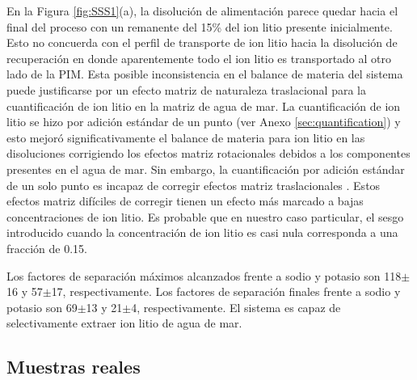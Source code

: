 En la Figura \ref{fig:SSS1}(a), la disolución de alimentación parece quedar hacia el final del proceso con un remanente del 15\% del ion litio presente inicialmente. Esto no concuerda con el perfil de transporte de ion litio hacia la disolución de recuperación en  donde aparentemente todo el ion litio es transportado al otro lado de la PIM. Esta posible inconsistencia en el balance de materia del sistema puede justificarse por un efecto matriz de naturaleza traslacional para la cuantificación de ion litio en la matriz de agua de mar. La cuantificación de ion litio se hizo por adición estándar de un punto (ver Anexo \ref{sec:quantification}) y esto mejoró significativamente el balance de materia para ion litio en las disoluciones corrigiendo los efectos matriz rotacionales debidos a los componentes presentes en el agua de mar. Sin embargo, la cuantificación por adición estándar de un solo punto es incapaz de corregir efectos matriz traslacionales \citep{Ellison2008}. Estos efectos matriz difíciles de corregir tienen un efecto más marcado a bajas concentraciones de ion litio. Es probable que en nuestro caso particular, el sesgo introducido cuando la concentración de ion litio es casi nula corresponda a una fracción de 0.15.

Los factores de separación máximos alcanzados frente a sodio y potasio son 118$\pm$16 y 57$\pm$17, respectivamente. Los factores de separación finales frente a sodio y potasio son 69$\pm$13 y 21$\pm$4, respectivamente. El sistema es capaz de selectivamente extraer ion litio de agua de mar.

\clearpage
\subsection{Muestras reales}

